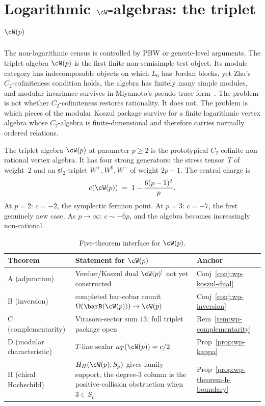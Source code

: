 
\chapter{\texorpdfstring{Logarithmic $\cW$-algebras: the triplet
$\cW(p)$}{Logarithmic W-algebras: the triplet W(p)}}
\label{chap:logarithmic-w-algebras}\label{ch:logarithmic-w-algebras}

The non-logarithmic census is controlled by PBW or generic-level
arguments. The triplet algebra $\cW(p)$ is the first finite
non-semisimple test object. Its module category has indecomposable
objects on which $L_0$ has Jordan blocks, yet Zhu's
$C_2$-cofiniteness condition holds, the algebra has finitely many
simple modules, and modular invariance survives in Miyamoto's
pseudo-trace form~\cite{Miyamoto04}. The problem is not whether
$C_2$-cofiniteness restores rationality. It does not. The problem is
which pieces of the modular Koszul package survive for a finite
logarithmic vertex algebra whose $C_2$-algebra is finite-dimensional
and therefore carries normally ordered relations.

The triplet algebra $\cW(p)$ at parameter $p \geq 2$ is the
prototypical $C_2$-cofinite non-rational vertex algebra. It has four
strong generators: the stress tensor~$T$ of weight~$2$ and an
$\mathfrak{sl}_2$-triplet $W^+, W^0, W^-$ of weight $2p - 1$. The
central charge is
\begin{equation}\label{eq:wp-central-charge}
 c(\cW(p)) \;=\; 1 - \frac{6(p-1)^2}{p}.
\end{equation}
At $p = 2$: $c = -2$, the symplectic fermion point. At $p = 3$:
$c = -7$, the first genuinely new case. As $p \to \infty$:
$c \sim -6p$, and the algebra becomes increasingly non-rational.

\begin{table}[ht]
\centering
\small
\caption{Five-theorem interface for
$\cW(p)$.}\label{tab:wp-five-theorems}
\begin{tabular}{lll}
\toprule
\textbf{Theorem} & \textbf{Statement for $\cW(p)$}
 & \textbf{Anchor} \\
\midrule
A (adjunction) &
 Verdier/Koszul dual $\cW(p)^!$ not yet constructed
 & Conj~\ref{conj:wp-koszul-dual} \\
B (inversion) &
 completed bar-cobar counit
 $\Omega(\barB(\cW(p)))\to\cW(p)$
 & Conj~\ref{conj:wp-inversion} \\
C (complementarity) &
 Virasoro-sector sum $13$; full triplet package open
 & Rem~\ref{rem:wp-complementarity} \\
D (modular characteristic) &
 $T$-line scalar $\kappa_T(\cW(p)) = c/2$
 & Prop~\ref{prop:wp-kappa} \\
H (chiral Hochschild) &
 $H_H(\cW(p);S_p)$ gives family support; the degree-$3$ column is the
 positive-collision obstruction when $3\in S_p$
 & Prop~\ref{prop:wp-theorem-h-boundary} \\
\bottomrule
\end{tabular}
\end{table}

